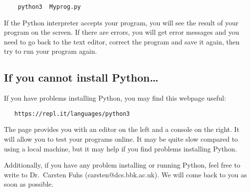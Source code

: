 \begin{Verbatim}
    python3  Myprog.py
\end{Verbatim}

If the %
Python interpreter accepts your program,
you will see the result of your
program on the screen.
%
If there are errors, you will get error messages and you need
to go back to the text editor, correct the program and save it again,
then try to run your program again.



\subsection*{If you cannot install Python\ldots}
\label{sec:if-you-cannot}

If you have problems installing Python, you may find this webpage useful:

\begin{verbatim}
   https://repl.it/languages/python3
\end{verbatim}

The page provides you with an editor on the left and a console on the
right. It will allow you to test your programs online. It may be quite
slow compared to using a local machine, but it may help if you find
problems installing Python. 

Additionally, if you have any problem installing or running Python,
feel free to write to Dr.\ Carsten Fuhs
(carsten@dcs.bbk.ac.uk). We will come back to you as soon as possible.


